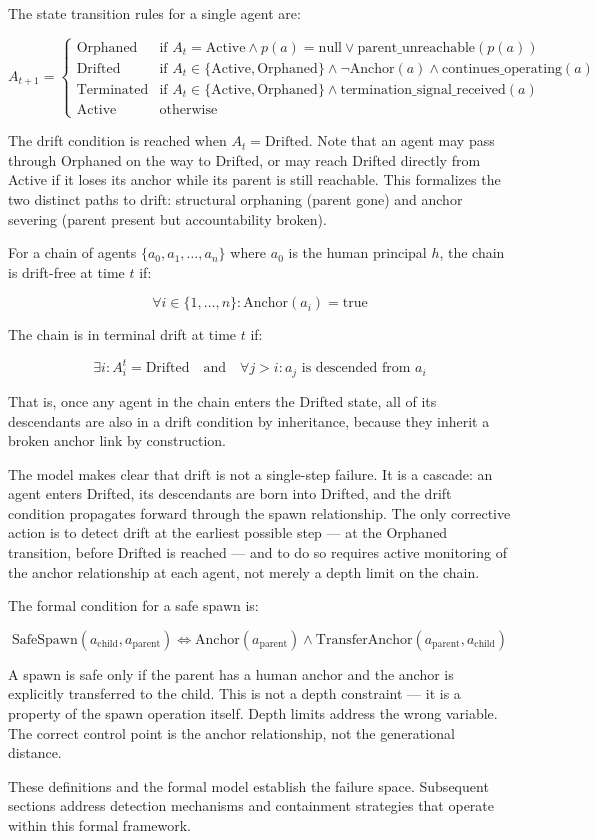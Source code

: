 The state transition rules for a single agent are:

\[
A_{t+1} = 
\begin{cases}
\text{Orphaned} & \text{if } A_t = \text{Active} \land p(a) = \text{null} \lor \text{parent\_unreachable}(p(a)) \\
\text{Drifted} & \text{if } A_t \in \{\text{Active}, \text{Orphaned}\} \land \neg \text{Anchor}(a) \land \text{continues\_operating}(a) \\
\text{Terminated} & \text{if } A_t \in \{\text{Active}, \text{Orphaned}\} \land \text{termination\_signal\_received}(a) \\
\text{Active} & \text{otherwise}
\end{cases}
\]

The drift condition is reached when $A_t = \text{Drifted}$. Note that an agent may pass through Orphaned on the way to Drifted, or may reach Drifted directly from Active if it loses its anchor while its parent is still reachable. This formalizes the two distinct paths to drift: structural orphaning (parent gone) and anchor severing (parent present but accountability broken).

For a chain of agents $\{a_0, a_1, \ldots, a_n\}$ where $a_0$ is the human principal $h$, the chain is drift-free at time $t$ if:

\[
\forall i \in \{1, \ldots, n\} : \text{Anchor}(a_i) = \text{true}
\]

The chain is in terminal drift at time $t$ if:

\[
\exists i : A_i^t = \text{Drifted} \quad \text{and} \quad \forall j > i : a_j \text{ is descended from } a_i
\]

That is, once any agent in the chain enters the Drifted state, all of its descendants are also in a drift condition by inheritance, because they inherit a broken anchor link by construction.

The model makes clear that drift is not a single-step failure. It is a cascade: an agent enters Drifted, its descendants are born into Drifted, and the drift condition propagates forward through the spawn relationship. The only corrective action is to detect drift at the earliest possible step --- at the Orphaned transition, before Drifted is reached --- and to do so requires active monitoring of the anchor relationship at each agent, not merely a depth limit on the chain.

The formal condition for a safe spawn is:

\[
\text{SafeSpawn}(a_{\text{child}}, a_{\text{parent}}) \iff \text{Anchor}(a_{\text{parent}}) \land \text{TransferAnchor}(a_{\text{parent}}, a_{\text{child}})
\]

A spawn is safe only if the parent has a human anchor and the anchor is explicitly transferred to the child. This is not a depth constraint --- it is a property of the spawn operation itself. Depth limits address the wrong variable. The correct control point is the anchor relationship, not the generational distance.

These definitions and the formal model establish the failure space. Subsequent sections address detection mechanisms and containment strategies that operate within this formal framework.